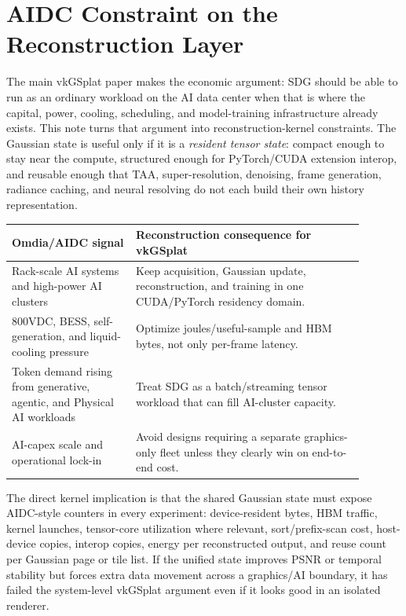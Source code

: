 \documentclass[11pt]{article}
\begin{document}
\section{AIDC Constraint on the Reconstruction Layer}

The main vkGSplat paper makes the economic argument: SDG should be able to run
as an ordinary workload on the AI data center when that is where the capital,
power, cooling, scheduling, and model-training infrastructure already exists.
This note turns that argument into reconstruction-kernel constraints. The
Gaussian state is useful only if it is a \emph{resident tensor state}: compact
enough to stay near the compute, structured enough for PyTorch/CUDA extension
interop, and reusable enough that TAA, super-resolution, denoising, frame
generation, radiance caching, and neural resolving do not each build their own
history representation.

\begin{center}
\begin{tabular}{p{0.31\linewidth}p{0.58\linewidth}}
\toprule
Omdia/AIDC signal & Reconstruction consequence for vkGSplat \\
\midrule
Rack-scale AI systems and high-power AI clusters & Keep acquisition, Gaussian
update, reconstruction, and training in one CUDA/PyTorch residency domain. \\
800VDC, BESS, self-generation, and liquid-cooling pressure & Optimize
joules/useful-sample and HBM bytes, not only per-frame latency. \\
Token demand rising from generative, agentic, and Physical AI workloads & Treat
SDG as a batch/streaming tensor workload that can fill AI-cluster capacity. \\
AI-capex scale and operational lock-in & Avoid designs requiring a separate
graphics-only fleet unless they clearly win on end-to-end cost. \\
\bottomrule
\end{tabular}
\end{center}

The direct kernel implication is that the shared Gaussian state must expose
AIDC-style counters in every experiment: device-resident bytes, HBM traffic,
kernel launches, tensor-core utilization where relevant, sort/prefix-scan cost,
host-device copies, interop copies, energy per reconstructed output, and reuse
count per Gaussian page or tile list. If the unified state improves PSNR or
temporal stability but forces extra data movement across a graphics/AI boundary,
it has failed the system-level vkGSplat argument even if it looks good in an
isolated renderer.
\end{document}

